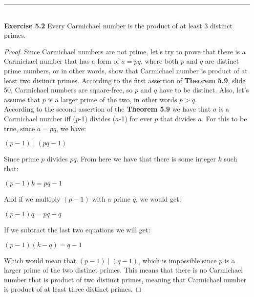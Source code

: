 \documentclass[a4paper]{article}
\begin{document}
\noindent\rule{12cm}{0.4pt}\\
\noindent \textbf{Exercise 5.2} Every Carmichael number is the product of at least 3 distinct primes.
\begin{proof}
Since Carmichael numbers are not prime, let's try to prove that there is a Carmichael number that has a form of $a=pq$, where both $p$ and $q$ are distinct prime numbers, or in other words, show that Carmichael number is product of at least two distinct primes. According to the first assertion of \textbf{Theorem 5.9}, slide 50, Carmichael numbers are square-free, so $p$ and $q$ have to be distinct. Also, let's assume that $p$ is a larger prime of the two, in other words $p > q$.\\
According to the second assertion of the \textbf{Theorem 5.9} we have that $a$ is a Carmichael number iff ($p$-1) divides ($a$-1) for ever $p$ that divides $a$. For this to be true, since $a = pq$, we have:
\begin{center}
$(p-1) \mid (pq - 1)$
\end{center}
Since prime $p$ divides $pq$. From here we have that there is some integer $k$ such that:
\begin{center}
$(p-1)k = pq - 1$
\end{center}
And if we multiply $(p-1)$ with a prime $q$, we would get:
\begin{center}
$(p-1)q = pq - q$
\end{center}
If we subtract the last two equations we will get:
\begin{center}
$(p-1)(k-q) = q - 1$
\end{center}
Which would mean that $(p-1) \mid (q-1)$, which is impossible since $p$ is a larger prime of the two distinct primes. This means that there is no Carmichael number that is product of two distinct primes, meaning that Carmichael number is product of at least three distinct primes.
\end{proof}
\end{document}
